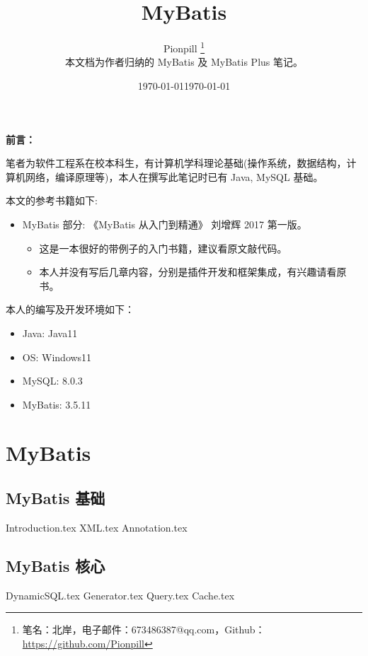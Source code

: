 \documentclass{PionpillNote-book}
\title{MyBatis}
\author{
    Pionpill \footnote{笔名：北岸，电子邮件：673486387@qq.com，Github：\url{https://github.com/Pionpill}} \\
    本文档为作者归纳的 MyBatis 及 MyBatis Plus 笔记。\\
}
\date{\today}
\begin{document}
\pagestyle{plain}
\maketitle

\noindent\textbf{前言：}

笔者为软件工程系在校本科生，有计算机学科理论基础(操作系统，数据结构，计算机网络，编译原理等)，本人在撰写此笔记时已有 Java, MySQL 基础。

本文的参考书籍如下:
\begin{itemize}
    \item MyBatis 部分: 《MyBatis 从入门到精通》 刘增辉 2017 第一版。
    \begin{itemize}
        \item 这是一本很好的带例子的入门书籍，建议看原文敲代码。
        \item 本人并没有写后几章内容，分别是插件开发和框架集成，有兴趣请看原书。
    \end{itemize}
\end{itemize}

本人的编写及开发环境如下：
\begin{itemize}
    \item Java: Java11
    \item OS: Windows11 
    \item MySQL: 8.0.3
    \item MyBatis: 3.5.11
\end{itemize}

\date{\today}
\newpage

\tableofcontents

\newpage

\setcounter{page}{1} 
\pagestyle{fancy}

\part{MyBatis}
\chapter{MyBatis 基础}
{Introduction.tex}
{XML.tex}
{Annotation.tex}
\chapter{MyBatis 核心}
{DynamicSQL.tex}
{Generator.tex}
{Query.tex}
{Cache.tex}
\end{document}
